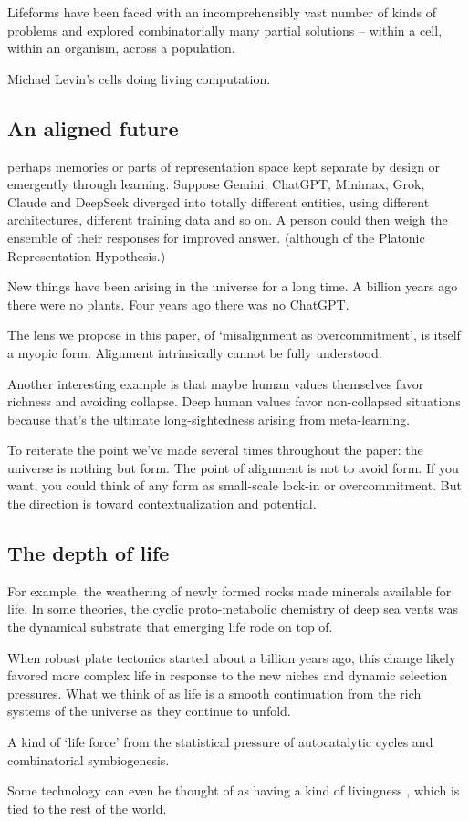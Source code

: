 Lifeforms have been faced with an incomprehensibly vast number of kinds of problems and explored combinatorially many partial solutions -- within a cell, within an organism, across a population. 


Michael Levin's cells doing living computation.

\subsection{An aligned future}


perhaps memories or parts of representation space kept separate by design or emergently through learning. Suppose Gemini, ChatGPT, Minimax, Grok, Claude and DeepSeek diverged into totally different entities, using different architectures, different training data and so on. A person could then weigh the ensemble of their responses for improved answer. (although cf the Platonic Representation Hypothesis.)

New things have been arising in the universe for a long time. A billion years ago there were no plants. Four years ago there was no ChatGPT. 

The lens we propose in this paper, of `misalignment as overcommitment', is itself a myopic form. Alignment intrinsically cannot be fully understood. 


Another interesting example is that maybe human values themselves favor richness and avoiding collapse. Deep human values favor non-collapsed situations because that's the ultimate long-sightedness arising from meta-learning.


To reiterate the point we've made several times throughout the paper: the universe is nothing but form. The point of alignment is not to avoid form. If you want, you could think of any form as small-scale lock-in or overcommitment. But the direction is toward contextualization and potential. 

\subsection{The depth of life}

For example, the weathering of newly formed rocks made minerals available for life. In some theories, the cyclic proto-metabolic chemistry of deep sea vents was the dynamical substrate that emerging life rode on top of.

When robust plate tectonics started about a billion years ago, this change likely favored more complex life in response to the new niches and dynamic selection pressures. What we think of as life is a smooth continuation from the rich systems of the universe as they continue to unfold.

A kind of `life force' from the statistical pressure of autocatalytic cycles and combinatorial symbiogenesis.

Some technology can even be thought of as having a kind of livingness \citep{bedau2010living}, which is tied to the rest of the world.

